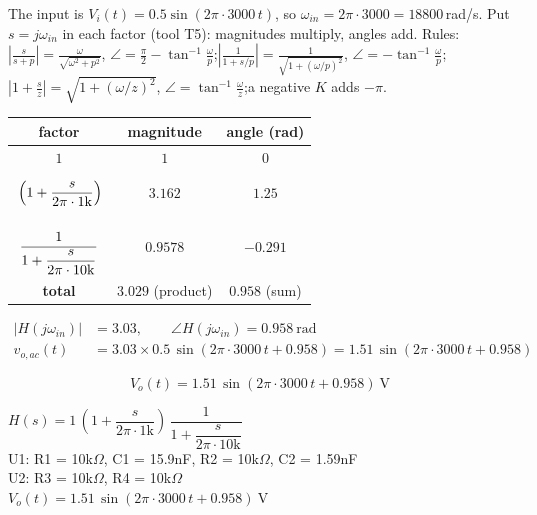 \documentclass[11pt]{article}
\begin{document}
The input is $V_i(t) = 0.5\sin\left(2\pi\cdot 3000\,t\right)$, so $\omega_{in} = 2\pi\cdot 3000 = 18800$\,rad/s. Put $s=j\omega_{in}$ in each factor (tool T5): magnitudes multiply, angles add.
{\small Rules: $\left|\frac{s}{s+p}\right| = \frac{\omega}{\sqrt{\omega^2+p^2}}$, $\angle = \frac{\pi}{2}-\tan^{-1}\frac{\omega}{p}$;\quad $\left|\frac{1}{1+s/p}\right| = \frac{1}{\sqrt{1+(\omega/p)^2}}$, $\angle = -\tan^{-1}\frac{\omega}{p}$;\quad $\left|1+\frac{s}{z}\right| = \sqrt{1+(\omega/z)^2}$, $\angle = \tan^{-1}\frac{\omega}{z}$;\quad a negative $K$ adds $-\pi$.}
\begin{center}\renewcommand{\arraystretch}{1.35}
\begin{tabular}{ccc}
\toprule
factor & magnitude & angle (rad) \\
\midrule
$1$ & $1$ & $0$ \\
$\rule[-1.1em]{0pt}{2.8em}\left(1+\dfrac{s}{2\pi\cdot 1\mathrm{k}}\right)$ & $3.162$ & $1.25$ \\
$\rule[-1.7em]{0pt}{4em}\dfrac{1}{1+\dfrac{s}{2\pi\cdot 10\mathrm{k}}}$ & $0.9578$ & $-0.291$ \\
\textbf{total} & $\mathbf{3.029}$ (product) & $\mathbf{0.958}$ (sum) \\
\bottomrule
\end{tabular}\end{center}

\begin{align*}
|H(j\omega_{in})| &= 3.03, \qquad \angle H(j\omega_{in}) = 0.958\ \mathrm{rad} \\
v_{o,ac}(t) &= 3.03\times 0.5\,\sin\left(2\pi\cdot 3000\,t + 0.958\right) = 1.51\,\sin\left(2\pi\cdot 3000\,t + 0.958\right)
\end{align*}

\[
\boxed{V_o(t) = 1.51\,\sin\left(2\pi\cdot 3000\,t + 0.958\right)\ \mathrm{V}}
\]

\begin{ansbox}
$H(s) = 1\,\left(1+\dfrac{s}{2\pi\cdot 1\mathrm{k}}\right)\,\dfrac{1}{1+\dfrac{s}{2\pi\cdot 10\mathrm{k}}}$\\[4pt]
U1: R1 = 10k$\Omega$, C1 = 15.9nF, R2 = 10k$\Omega$, C2 = 1.59nF\\
U2: R3 = 10k$\Omega$, R4 = 10k$\Omega$\\[4pt]
$V_o(t) = 1.51\,\sin\left(2\pi\cdot 3000\,t + 0.958\right)\ \mathrm{V}$
\end{ansbox}

\newpage
\end{document}
